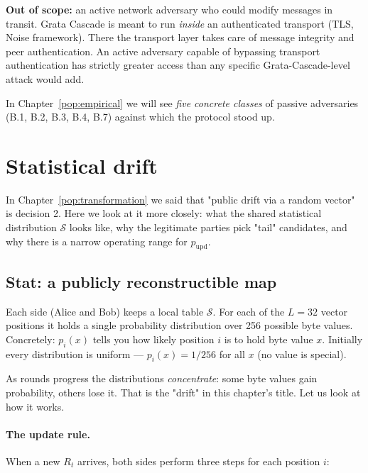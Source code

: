 \documentclass[11pt,a4paper]{article}
\begin{document}
\textbf{Out of scope:} an active network adversary who could modify messages in transit. Grata Cascade is meant to run \emph{inside} an authenticated transport (TLS, Noise framework). There the transport layer takes care of message integrity and peer authentication. An active adversary capable of bypassing transport authentication has strictly greater access than any specific Grata-Cascade-level attack would add.

In Chapter~\ref{pop:empirical} we will see \emph{five concrete classes} of passive adversaries (B.1, B.2, B.3, B.4, B.7) against which the protocol stood up.

\section{Statistical drift}\label{pop:drift}

In Chapter~\ref{pop:transformation} we said that "public drift via a random vector" is decision 2. Here we look at it more closely: what the shared statistical distribution $\mathcal{S}$ looks like, why the legitimate parties pick "tail" candidates, and why there is a narrow operating range for $p_\text{upd}$.

\subsection{Stat: a publicly reconstructible map}\label{pop:stat-map}

Each side (Alice and Bob) keeps a local table $\mathcal{S}$. For each of the $L = 32$ vector positions it holds a single probability distribution over 256 possible byte values. Concretely: $p_i(x)$ tells you how likely position $i$ is to hold byte value $x$. Initially every distribution is uniform --- $p_i(x) = 1/256$ for all $x$ (no value is special).

As rounds progress the distributions \emph{concentrate}: some byte values gain probability, others lose it. That is the "drift" in this chapter's title. Let us look at how it works.

\paragraph{The update rule.} When a new $R_t$ arrives, both sides perform three steps for each position $i$:
\end{document}
